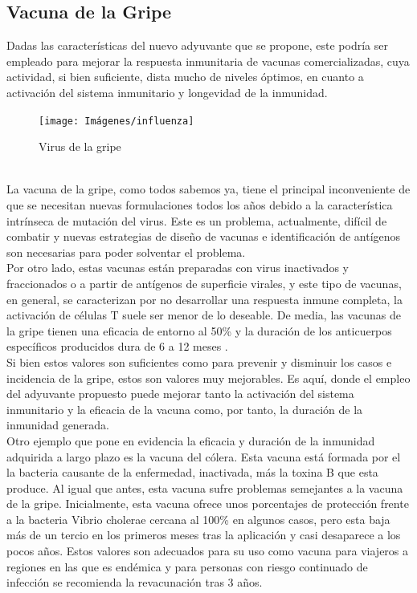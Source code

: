 \documentclass[a4paper,11pt]{article}
\begin{document}
\subsection{Vacuna de la Gripe}
Dadas las características del nuevo adyuvante que se propone, este podría ser empleado para mejorar la respuesta inmunitaria de vacunas comercializadas, cuya actividad, si bien suficiente, dista mucho de niveles óptimos, en cuanto a activación del sistema inmunitario y longevidad de la inmunidad.
\begin{figure}[h]
	\centering
	\texttt{[image: Imágenes/influenza]}
	\caption{Virus de la gripe}

\end{figure}
\\La vacuna de la gripe, como todos sabemos ya, tiene el principal inconveniente de que se necesitan nuevas formulaciones todos los años debido a la característica intrínseca de mutación del virus. Este es un problema, actualmente, difícil de combatir y nuevas estrategias de diseño de vacunas e identificación de antígenos son necesarias para poder solventar el problema.
\\Por otro lado, estas vacunas están preparadas con virus inactivados y fraccionados o a partir de antígenos de superficie virales, y este tipo de vacunas, en general, se caracterizan por no desarrollar una respuesta inmune completa, la activación de células T suele ser menor de lo deseable. De media, las vacunas de la gripe tienen una eficacia de entorno al 50\%  y la duración de los anticuerpos específicos producidos dura de 6 a 12 meses .
\\Si bien estos valores son suficientes como para prevenir y disminuir los casos e incidencia de la gripe, estos son valores muy mejorables. Es aquí, donde el empleo del adyuvante propuesto puede mejorar tanto la activación del sistema inmunitario y la eficacia de la vacuna como, por tanto, la duración de la inmunidad generada.
\\Otro ejemplo que pone en evidencia la eficacia y duración de la inmunidad adquirida a largo plazo es la vacuna del cólera. Esta vacuna está formada por el la bacteria causante de la enfermedad, inactivada, más la toxina B que esta produce. Al igual que antes, esta vacuna sufre problemas semejantes a la vacuna de la gripe. Inicialmente, esta vacuna ofrece unos porcentajes de protección frente a la bacteria Vibrio cholerae cercana al 100\% en algunos casos, pero esta baja más de un tercio en los primeros meses tras la aplicación y casi desaparece a los pocos años. Estos valores son adecuados para su uso como vacuna para viajeros a regiones en las que es endémica y para personas con riesgo continuado de infección se recomienda la revacunación tras 3 años.
\end{document}

